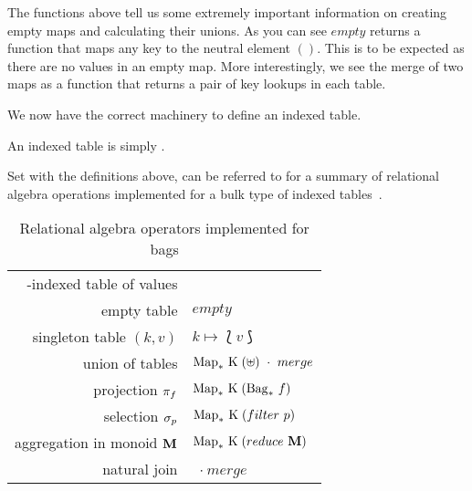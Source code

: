 The functions above tell us some extremely important information on creating
empty maps and calculating their unions. As you can see $empty$ returns a
function that maps any key to the neutral element $()$. This is to be expected
as there are no values in an empty map. More interestingly, we see the merge
of two maps as a function that returns a pair of key lookups in each table.

We now have the correct machinery to define an indexed table.

\begin{indexedtabledef}
    An indexed table \indexedTable{\keyset}{\valset} is simply .
\end{indexedtabledef}

Set with the definitions above,  can be referred
to for a summary of relational algebra operations implemented for a bulk type of
indexed tables~\cite{RelationalAlgebraByWayOfAdjunctions}.

\begin{table}[h]
    \centering
    \begin{tabular}{r|l}
        \keyset{}-indexed table of \valset{} values & \indexedTable{\keyset}{\valset} \\
        empty table & $empty$ \\
        singleton table $(k, v)$ & $k \mapsto \lbag v \rbag$ \\
        union of tables & $\finitemap{\keyset}{(\uplus)}\ \cdot\ merge$ \\
        projection $\pi_{f}$ & $\mathrm{Map}_*\ \mathrm{K}\;(\mathrm{Bag}_*\ f)$ \\
        selection $\sigma_{p}$ & $\mathrm{Map}_*\ \mathrm{K}\;(filter\ p)$ \\
        aggregation in monoid $\mathrm{\textbf{M}}$ & $\mathrm{Map}_*\ \mathrm{K}\;(reduce\
        \mathrm{\textbf{M}})$\\
            natural join & \finitemap{\keyset}{(\times)}\ $\cdot\ merge$ \\
    \end{tabular}
    \caption{Relational algebra operators implemented for bags}
    \label{tab:BagRelAlgOps}
\end{table}
